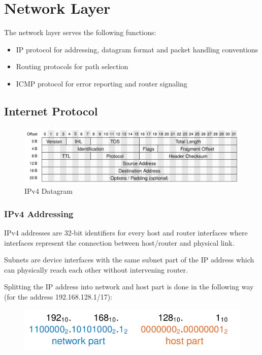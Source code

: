 
\section{Network Layer}
The network layer serves the following functions:
\begin{itemize}
  \item IP protocol for addressing, datagram format and packet handling conventions
  \item Routing protocols for path selection
  \item ICMP protocol for error reporting and router signaling
\end{itemize}

\subsection{Internet Protocol}
\begin{figure}[H]
  \centering
  \includegraphics[width=.8\textwidth]{figures/ipv4_datagram.png}
  \caption{IPv4 Datagram}\label{fig:ipv4_datagram}
\end{figure}

\subsubsection*{IPv4 Addressing}
IPv4 addresses are 32-bit identifiers for every host and router interfaces where interfaces represent the connection between host/router and physical link.

Subnets are device interfaces with the same subnet part of the IP address which can physically reach each other without intervening router.

Splitting the IP address into network and host part is done in the following way (for the address 192.168.128.1/17):
\begin{figure}[H]
  \centering
  \includegraphics[width=.6\textwidth]{figures/ip_split.png}
\end{figure}

